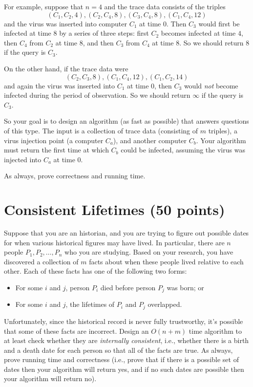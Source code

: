 \documentclass[11pt]{article}
\begin{document}
    For example, suppose that $n = 4$ and the trace data consists of the triples
    \begin{equation*}
        (C_1, C_2, 4), (C_2, C_4, 8), (C_3, C_4, 8), (C_1, C_4, 12)
    \end{equation*}
    and the virus was inserted into computer $C_1$ at time $0$.  Then $C_3$ would first be infected at time 
    $8$ by a series of three steps: first $C_2$ becomes infected at time $4$, then $C_4$ from $C_2$ at time 
    $8$, and then $C_3$ from $C_4$ at time $8$.  So we should return $8$ if the query is $C_3$.  

    On the other hand, if the trace data were 
    \begin{equation*}
        (C_2, C_3, 8), (C_1, C_4, 12), (C_1, C_2, 14)
    \end{equation*}
    and again the virus was inserted into $C_1$ at time $0$, then $C_3$ would \emph{not} become infected 
    during the period of observation.  So we should return $\infty$ if the query is $C_3$.  

    So your goal is to design an algorithm (as fast as possible) that answers questions of this type.  
    The input is a collection of trace data (consisting of $m$ triples),  a virus injection point (a 
    computer $C_a$), and another computer $C_b$.  Your algorithm must return the first time at which 
    $C_b$ could be infected, assuming the virus was injected into $C_a$ at time $0$.  

    As always, prove correctness and running time.  

\section{Consistent Lifetimes (50 points)}

Suppose that you are an historian, and you are trying to figure out possible dates for when various historical figures may have lived.  In particular, there are $n$ people $P_1, P_2, \dots, P_n$ who you are studying.  Based on your research, you have discovered a collection of $m$ facts about when these people lived relative to each other.  Each of these facts has one of the following two forms:
\begin{itemize}
\item For some $i$ and $j$, person $P_i$ died before person $P_j$ was born; or
\item For some $i$ and $j$, the lifetimes of $P_i$ and $P_j$ overlapped. 
\end{itemize}

Unfortunately, since the historical record is never fully trustworthy, it's possible that some of these facts are incorrect.  Design an $O(n+m)$ time algorithm to at least check whether they are \emph{internally consistent}, i.e., whether there is a birth and a death date for each person so that all of the facts are true.  As always, prove running time and correctness (i.e., prove that if there is a possible set of dates then your algorithm will return yes, and if no such dates are possible then your algorithm will return no).
\end{document}
